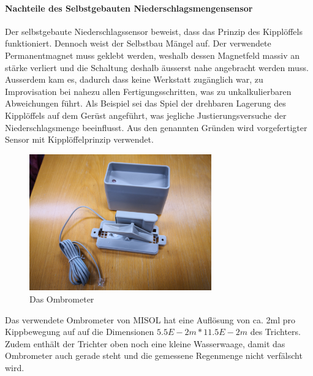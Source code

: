 \paragraph{Nachteile des Selbstgebauten Niederschlagsmengensensor}
Der selbstgebaute Niederschlagssensor beweist, dass das Prinzip des Kipplöffels funktioniert. Dennoch weist der Selbstbau Mängel auf. Der verwendete Permanentmagnet muss geklebt werden, weshalb dessen Magnetfeld massiv an stärke verliert und die Schaltung deshalb äusserst nahe angebracht werden muss. Ausserdem kam es, dadurch dass keine Werkstatt zugänglich war, zu Improvisation bei nahezu allen Fertigungsschritten, was zu unkalkulierbaren Abweichungen führt. Als Beispiel sei das Spiel der drehbaren Lagerung des Kipplöffels auf dem Gerüst angeführt, was jegliche Justierungsversuche der Niederschlagsmenge beeinflusst. Aus den genannten Gründen wird vorgefertigter Sensor mit Kipplöffelprinzip verwendet.\\

\begin{figure}[hbtp]
\centering
\includegraphics[width=0.7\textwidth]{graphics/ombrometer/IMG_20190118_110027.jpg}
\caption{Das Ombrometer}
\label{fig:verwendetes_ombrometer}
\end{figure}

Das verwendete Ombrometer von MISOL hat eine Auflösung von ca. 2ml pro Kippbewegung auf auf die Dimensionen $5.5E-2m*11.5E-2m$ des Trichters. Zudem enthält der Trichter oben noch eine kleine Wasserwaage, damit das Ombrometer auch gerade steht und die gemessene Regenmenge nicht verfälscht wird.\\

